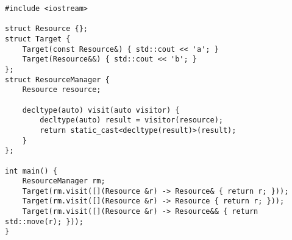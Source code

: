 \begin{lstlisting}[title=\href{https://godbolt.org/z/hwKje8}{\texttt{godbolt.org/z/hwKje8}}]
#include <iostream>

struct Resource {};
struct Target {
    Target(const Resource&) { std::cout << 'a'; }
    Target(Resource&&) { std::cout << 'b'; }
};
struct ResourceManager {
    Resource resource;

    decltype(auto) visit(auto visitor) {
        decltype(auto) result = visitor(resource);
        return static_cast<decltype(result)>(result);
    }
};

int main() {
    ResourceManager rm;
    Target(rm.visit([](Resource &r) -> Resource& { return r; }));
    Target(rm.visit([](Resource &r) -> Resource { return r; }));
    Target(rm.visit([](Resource &r) -> Resource&& { return std::move(r); }));
}
\end{lstlisting}
